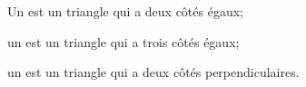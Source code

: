 



\begin{definition}
Un  est un triangle qui a deux côtés égaux;

un  est un triangle qui a trois côtés égaux;

un  est un triangle qui a deux côtés perpendiculaires.
\end{definition}




